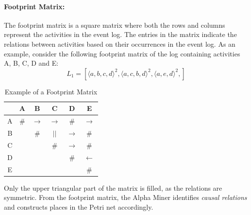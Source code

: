 \paragraph{Footprint Matrix:}
The footprint matrix is a square matrix where both the rows and columns represent the activities in the event log. The entries in the matrix indicate the relations between activities based on their occurrences in the event log.
As an example, consider the following footprint matrix of the log containing activities A, B, C, D and E:
\[L_1 = \left[ \langle a,b,c,d \rangle^2, \langle a,c,b,d \rangle^2, \langle a,e,d \rangle^2,  \right]\]
\begin{table}[H]
    \centering
    \begin{tabular}{c|ccccc}
        & A & B & C & D & E \\
        \hline
        A & $\#$ & $\rightarrow$ & $\rightarrow$ & $\#$ & $\rightarrow$ \\
        B &  & $\#$ & $||$ & $\rightarrow$ & $\#$ \\
        C &  &  & $\#$ & $\rightarrow$ & $\#$ \\
        D &  &  &  & $\#$ & $\leftarrow$ \\
        E &  &  &  &  & $\#$ \\
    \end{tabular}
    \caption{Example of a Footprint Matrix}
\end{table}
Only the upper triangular part of the matrix is filled, as the relations are symmetric.
From the footprint matrix, the Alpha Miner identifies \textit{causal relations} and constructs places in the Petri net accordingly.
